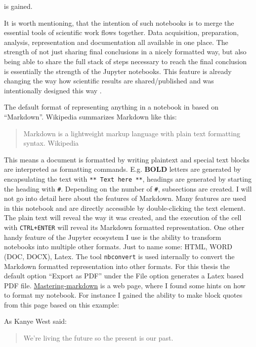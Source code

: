 \documentclass[11pt]{article}
\begin{document}
is gained.

It is worth mentioning, that the intention of such notebooks is to merge
the essential tools of scientific work flows together. Data acquisition,
preparation, analysis, representation and documentation all available in
one place. The strength of not just sharing final conclusions in a
nicely formatted way, but also being able to share the full stack of
steps necessary to reach the final conclusion is essentially the
strength of the Jupyter notebooks. This feature is already changing the
way how scientific results are shared/published and was intentionally
designed this way \cite{Randles2017}.

The default format of representing anything in a notebook in based on
``Markdown''. Wikipedia summarizes Markdown like this:

\begin{quote}
Markdown is a lightweight markup language with plain text formatting
syntax. Wikipedia
\end{quote}

This means a document is formatted by writing plaintext and special text
blocks are interpreted as formatting commands. E.g. \textbf{BOLD}
letters are generated by encapsulating the text with
\texttt{**\ Text\ here\ **}, headings are generated by starting the
heading with \texttt{\#}. Depending on the number of \texttt{\#},
subsections are created. I will not go into detail here about the
features of Markdown. Many features are used in this notebook and are
directly accessible by double-clicking the text element. The plain text
will reveal the way it was created, and the execution of the cell with
\texttt{CTRL+ENTER} will reveal its Markdown formatted representation.
One other handy feature of the Jupyter ecosystem I use is the ability to
transform notebooks into multiple other formats. Just to name some:
HTML, WORD (DOC, DOCX), Latex. The tool \texttt{nbconvert} is used
internally to convert the Markdown formatted representation into other
formats. For this thesis the default option ``Export as PDF'' under the
File option generates a Latex based PDF file.
\href{https://guides.github.com/features/mastering-markdown/}{Mastering-markdown}
is a web page, where I found some hints on how to format my notebook.
For instance I gained the ability to make block quotes from this page
based on this example:

As Kanye West said:

\begin{quote}
We're living the future so the present is our past.
\end{quote}
\end{document}
